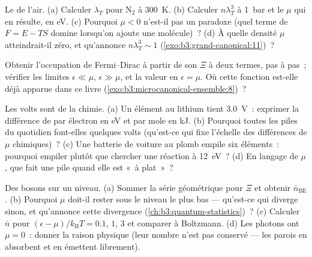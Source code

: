 \begin{exercise}[$\star$]\label{exo:b3:grand-canonical:2}
Le  de l'air. (a) Calculer $\lambda_T$ pour N$_2$
à \qty{300}{K}. (b) Calculer $n\lambda_T^3$ à \qty{1}{bar} et le $\mu$
qui en résulte, en eV. (c) Pourquoi $\mu < 0$ n'est-il pas un paradoxe
(quel terme de $F = E - TS$ domine lorsqu'on ajoute une molécule)~? (d)
À quelle densité $\mu$ atteindrait-il zéro, et qu'annonce
$n\lambda_T^3 \sim 1$ (\cref{exo:b3:grand-canonical:11})~?
\end{exercise}

\begin{exercise}[$\star$]\label{exo:b3:grand-canonical:3}
Obtenir l'occupation de Fermi--Dirac à partir de son $\Xi$ à deux
termes, pas à pas~; vérifier les limites $\epsilon \ll \mu$, $\epsilon \gg
\mu$, et la valeur en $\epsilon = \mu$. Où cette
fonction est-elle déjà apparue dans ce livre
(\cref{exo:b3:microcanonical-ensemble:8})~?
\end{exercise}

\begin{exercise}[$\star$]\label{exo:b3:grand-canonical:4}
Les volts sont de la chimie. (a) Un élément au lithium tient
\qty{3.0}{V}~: exprimer la différence de  par
électron en eV et par mole en kJ. (b) Pourquoi toutes les piles du
quotidien font-elles quelques volts (qu'est-ce qui fixe l'échelle des
différences de $\mu$ chimiques)~? (c) Une batterie de voiture au plomb
empile six éléments~: pourquoi empiler plutôt que chercher une
réaction à \qty{12}{eV}~? (d) En langage de $\mu$, que fait une pile
quand elle est «~à plat~»~?
\end{exercise}

\begin{exercise}[$\star\star$]\label{exo:b3:grand-canonical:5}
Des bosons sur un niveau. (a) Sommer la série géométrique pour $\Xi$
et obtenir $\bar n_{\text{BE}}$. (b) Pourquoi $\mu$ doit-il rester
sous le niveau le plus bas --- qu'est-ce qui diverge sinon, et
qu'annonce cette divergence (\cref{ch:b3:quantum-statistics})~? (c)
Calculer $\bar n$ pour $(\epsilon - \mu)/k_{\text{B}}T = 0.1$, $1$,
$3$ et comparer à Boltzmann. (d) Les photons ont $\mu = 0$~: donner
la raison physique (leur nombre n'est pas conservé --- les parois en
absorbent et en émettent librement).
\end{exercise}

